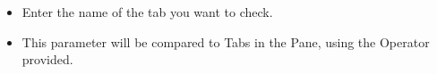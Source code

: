 \begin{itemize}
\item Enter the name of the tab you want to check.
\item This parameter will be compared to Tabs in the Pane, using the Operator provided.
 
\end{itemize}
